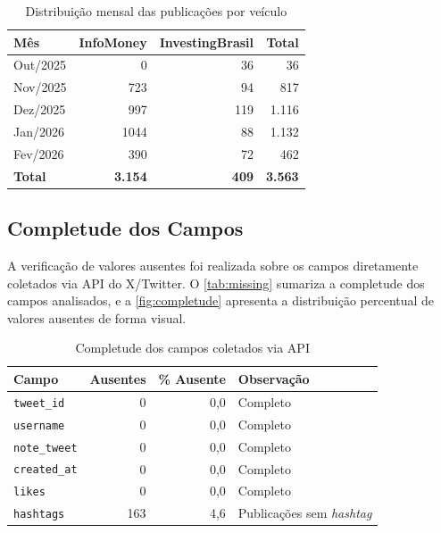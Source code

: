 \begin{table}[!htbp]
	\centering
	\caption{Distribuição mensal das publicações por veículo}
	\label{tab:dist_mensal}
	\begin{tabular}{lrrr}
		\hline
		\textbf{Mês}     & \textbf{InfoMoney} & \textbf{InvestingBrasil} & \textbf{Total} \\
		\hline
		Out/2025  &    0 &  36 &    36 \\
		\hline
		Nov/2025  &  723 &  94 &   817 \\
		\hline
		Dez/2025  &  997 & 119 & 1.116 \\
		\hline
		Jan/2026  & 1044 &  88 & 1.132 \\
		\hline
		Fev/2026  &  390 &  72 &   462 \\
		\hline
		\textbf{Total} & \textbf{3.154} & \textbf{409} & \textbf{3.563} \\
	\end{tabular}
\end{table}

 
\subsection{Completude dos Campos}
\label{subsec:completude}

A verificação de valores ausentes foi realizada sobre os campos diretamente coletados via API do X/Twitter. O \autoref{tab:missing} sumariza a completude dos campos analisados, e a \autoref{fig:completude} apresenta a distribuição percentual de valores ausentes de forma visual.

\begin{table}[!htbp]
	\centering
	\caption{Completude dos campos coletados via API}
	\label{tab:missing}
	\begin{tabular}{lrrl}
		\hline
		\textbf{Campo} & \textbf{Ausentes} & \textbf{\% Ausente} &
		\textbf{Observação} \\
		\hline
		\texttt{tweet\_id}   &   0 & 0,0 & Completo \\
		\hline
		\texttt{username}    &   0 & 0,0 & Completo \\
		\hline
		\texttt{note\_tweet} &   0 & 0,0 & Completo \\
		\hline
		\texttt{created\_at} &   0 & 0,0 & Completo \\
		\hline
		\texttt{likes}       &   0 & 0,0 & Completo \\
		\hline
		\texttt{hashtags}    & 163 & 4,6 & Publicações sem \textit{hashtag} \\
		\hline
	\end{tabular}
\end{table}


